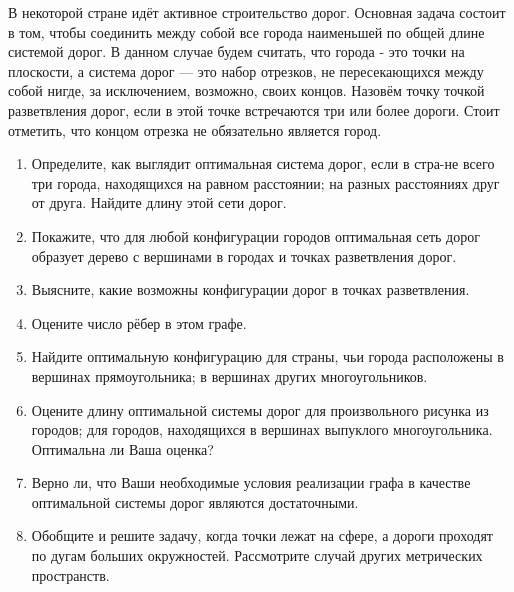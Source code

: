 В некоторой стране идёт активное строительство дорог. Основная задача состоит в том, чтобы соединить между собой все города наименьшей по общей длине системой дорог.
В данном случае будем считать, что города - это точки на плоскости, а система дорог — это набор отрезков, не пересекающихся между собой нигде, за исключением, возможно, своих концов. Назовём точку точкой разветвления дорог, если в этой точке встречаются три или более дороги. Стоит отметить, что концом отрезка не обязательно является город.
\begin{enumerate}
\item Определите, как выглядит оптимальная система дорог, если в стра-\linebreak не всего три города, находящихся на равном расстоянии; на разных расстояниях друг от друга. Найдите длину этой сети дорог.
\item Покажите, что для любой конфигурации городов оптимальная сеть дорог образует дерево с вершинами в городах и точках разветвления дорог.
\item Выясните, какие возможны конфигурации дорог в точках разветвления.
\item Оцените число рёбер в этом графе.
\item Найдите оптимальную конфигурацию для страны, чьи города расположены в вершинах прямоугольника; в вершинах других многоугольников.
\item Оцените длину оптимальной системы дорог для произвольного рисунка из городов; для городов, находящихся в вершинах выпуклого многоугольника. Оптимальна ли Ваша оценка?
\item Верно ли, что Ваши необходимые условия  реализации графа в качестве оптимальной системы дорог являются достаточными.
\item Обобщите и решите задачу, когда точки лежат на сфере, а дороги проходят по дугам больших окружностей. Рассмотрите случай других метрических пространств.
\end{enumerate}



